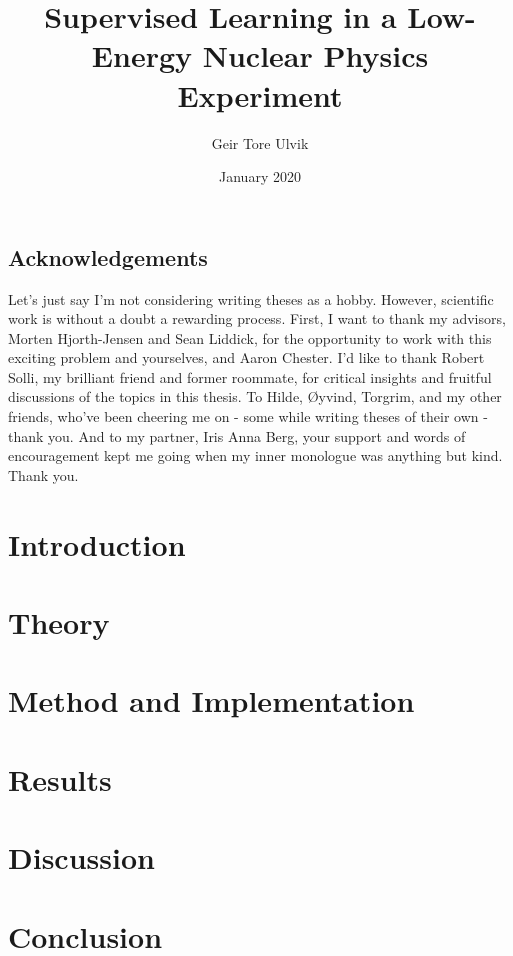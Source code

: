 \documentclass[twoside,english]{uiofysmaster}
\author{Geir Tore Ulvik}
\title{Supervised Learning in a Low-Energy Nuclear Physics Experiment}
\date{January 2020}
\begin{document}
\maketitle

\tableofcontents
\listoffigures

\newpage
\section*{Acknowledgements}
Let's just say I'm not considering writing theses as a hobby. However, scientific work
is without a doubt a rewarding process.
First, I want to thank my advisors, Morten Hjorth-Jensen and Sean Liddick, for the
opportunity to work with this exciting problem and yourselves, and Aaron Chester.
I'd like to thank Robert Solli, my brilliant friend and former roommate, for critical insights
and fruitful discussions of the topics in this thesis.
To Hilde, Øyvind, Torgrim, and my other friends, who've been cheering me on - some while writing theses 
of their own - thank you.
And to my partner, Iris Anna Berg, your support and words of encouragement kept me going
when my inner monologue was anything but kind. Thank you.
\newpage


\chapter{Introduction}

\chapter{Theory}

\chapter{Method and Implementation}

\chapter{Results}

\chapter{Discussion}

\chapter{Conclusion}

\begin{appendices}
    
\end{appendices}



\end{document}
